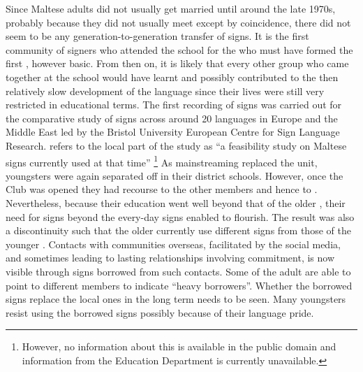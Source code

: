 \documentclass[output=paper]{langsci/langscibook}
\begin{document}
Since Maltese  adults did not usually get married \citep{g91}
until around the late 1970s, probably because they did not usually
meet except by coincidence, there did not seem to be any
generation-to-generation transfer of signs.  It is the first community
of signers who attended the school for the  who must have formed
the first , however basic.  From then on, it is
likely that every other group who came together at the school would
have learnt and possibly contributed to the then relatively slow
development of the language since their lives were still very
restricted in educational terms.  The first recording of signs was
carried out for the comparative study of signs across around 20 
languages in Europe and the Middle East led by the Bristol University
European Centre for Sign Language Research.  \citet{ba91}
refers to the local part of the study as “a feasibility study on
Maltese signs currently used at that time” \citep[52]{ba91}\footnote{However, no information about this is available in the
  public domain and information from the Education
  Department is currently unavailable.} As mainstreaming replaced the
 unit, youngsters were again separated off in their district
schools.  However, once the  Club was opened they had recourse to
the other  members and hence to .  Nevertheless,
because their education went well beyond that of the older , their
need for signs beyond the every-day signs enabled  to
flourish.  The result was also a discontinuity such that the older
 currently use different signs from those of the younger
. Contacts with  communities overseas, facilitated by the
social media, and sometimes leading to lasting relationships involving
commitment, is now visible through signs borrowed from such contacts.
Some of the adult  are able to point to different members to
indicate “heavy borrowers”. Whether the borrowed signs replace the
local ones in the long term needs to be seen. Many  youngsters
resist using the borrowed signs possibly because of their language
pride.
\end{document}
